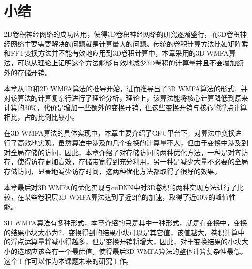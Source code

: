 \section{小结}
2D卷积神经网络的成功应用，使得3D卷积神经网络的研究逐渐盛行，而3D卷积神经网络主要需要解决的问题就是计算量大的问题。传统的卷积计算方法比如矩阵乘和FFT变换方法并不能有效地应用到3D卷积计算中，本章采用的3D WMFA算法，可以从理论上证明这个方法能够有效地减少3D卷积的计算量并且不会增加额外的存储开销。

本章从1D和2D WMFA算法的推导开始，进而推导出了3D WMFA算法的形式，并对该算法的计算复杂行进行了理论分析，理论上，该算法能将核心计算降低到原来计算的$30$\%，代价是增加一些额外的变换开销，但这些变换开销与核心的浮点计算相比，占的比例比较小。

在3D WMFA算法的具体实现中，本章主要介绍了GPU平台下，对算法中变换进行了高效地实现。虽然算法中涉及的几个变换的计算量不大，但由于变换中涉及到对全局存储的访问，因此，本章介绍了对存储访问的两种优化方法，一种是对齐访存，使得访存更加高效，存储带宽得到充分利用，另一种是减少大量不必要的全局存储访问，显著地减少访存时间，这两种优化方法都取得了很好的效果。

本章最后对3D WMFA的优化实现与cuDNN中对3D卷积的两种实现方法进行了比较，在某些卷积层3D WMFA算法达到了近2倍的加速，取得了近60\%的峰值性能。

3D WMFA算法有多种形式，本章介绍的只是其中一种形式，就是在变换中，变换的结果小块大小为2，变换得到的结果小块可以是其它值，该值越大，卷积计算中的浮点运算量将减小得越多，但是变换开销将增大，因此，对于变换结果的小块大小的选取应该会有一个最优值，使得最后3D WMFA算法的整体计算复杂性最低。这个工作可以作为本课题未来的研究工作。
























